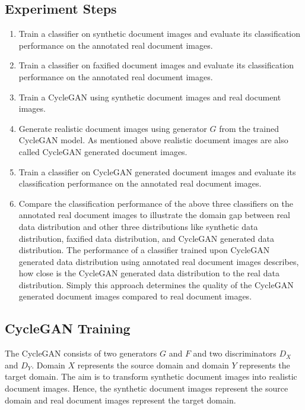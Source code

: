 \subsection{Experiment Steps}


\begin{enumerate}
    \itemsep0em 
    \item Train a classifier on synthetic document images and evaluate its classification performance on the annotated real document images.
    \item Train a classifier on faxified document images and evaluate its classification performance on the annotated real document images.
    \item Train a \ac{CycleGAN} using synthetic document images and real document images.
    \item Generate realistic document images using generator $G$ from the trained \ac{CycleGAN} model. As mentioned above realistic document images are also called \ac{CycleGAN} generated document images.
    \item Train a classifier on \ac{CycleGAN} generated document images and evaluate its classification performance on the annotated real document images.
    \item Compare the classification performance of the above three classifiers on the annotated real document images to illustrate the domain gap between real data distribution and other three distributions like synthetic data distribution, faxified data distribution, and \ac{CycleGAN} generated data distribution. The performance of a classifier trained upon \ac{CycleGAN} generated data distribution using annotated real document images describes, how close is the \ac{CycleGAN} generated data distribution to the real data distribution. Simply this approach determines the quality of the \ac{CycleGAN} generated document images compared to real document images.
\end{enumerate}


\subsection{\ac{CycleGAN} Training}

The \ac{CycleGAN} consists of two generators $G$ and $F$ and two discriminators $D_X$ and $D_Y$. Domain $X$ represents the source domain and domain $Y$ represents the target domain. The aim is to transform synthetic document images into realistic document images. Hence, the synthetic document images represent the source domain and real document images represent the target domain.


